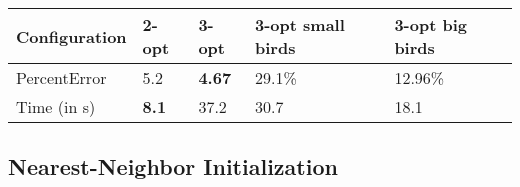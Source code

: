 \begin{table}[h!]
\centering
\begin{tabular}{ |p{2cm}||p{0.75cm}|p{0.75cm}|p{0.75cm}|p{0.75cm}|  }
 \hline
 Configuration& 2-opt & 3-opt & 3-opt small birds & 3-opt big birds\\
 \hline \hline
PercentError & 5.2 & \textbf{4.67} & 29.1\% & 12.96\%\\
 \hline
 Time (in s) & \textbf{8.1} & 37.2 & 30.7 & 18.1\\
 \hline
\end{tabular}
\caption{}
\label{3_opt_big_small_performance}
\end{table}

\subsection{Nearest-Neighbor Initialization}
